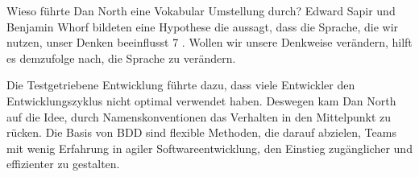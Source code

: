 Wieso führte Dan North eine Vokabular Umstellung durch? Edward Sapir und Benjamin Whorf bildeten eine Hypothese die aussagt, dass die Sprache, die wir nutzen, unser 
Denken beeinflusst 7 . Wollen wir unsere Denkweise verändern, hilft es demzufolge nach, die Sprache zu verändern.

Die Testgetriebene Entwicklung führte dazu, dass viele Entwickler den Entwicklungszyklus nicht optimal verwendet haben. Deswegen kam Dan North auf die Idee, durch
Namenskonventionen das Verhalten in den Mittelpunkt zu rücken. Die Basis von BDD sind flexible Methoden, die darauf abzielen, Teams mit wenig Erfahrung in agiler 
Softwareentwicklung, den Einstieg zugänglicher und effizienter zu gestalten.


